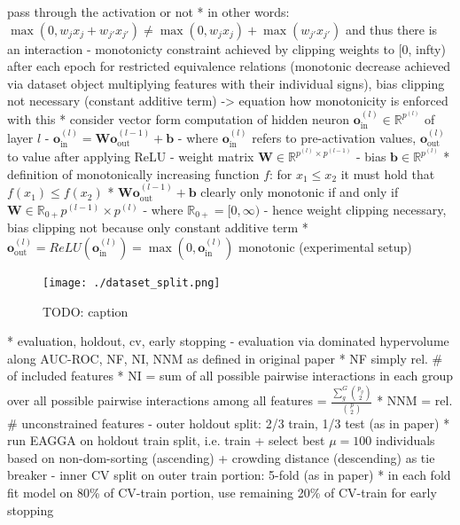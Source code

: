 \documentclass[twoside,11pt]{article}
\begin{document}
        pass through the activation or not
      * in other words: $\max(0,w_j x_j + w_{j'} x_{j'})\neq\max(0,w_j x_j)+\max(w_{j'} x_{j'})$ and thus there is an interaction
    - monotonicty constraint achieved by clipping weights to [0, infty) after each epoch for restricted equivalence relations (monotonic decrease achieved
      via dataset object multiplying features with their individual signs), bias clipping not necessary (constant additive term)
      -> equation how monotonicity is enforced with this
      * consider vector form computation of hidden neuron $\boldsymbol{o}_{\text{in}}^{(l)}\in\mathbb{R}^{p^{(l)}}$ of layer $l$
        - $\boldsymbol{o}_{\text{in}}^{(l)}=\boldsymbol{W} \boldsymbol{o}_{\text{out}}^{(l-1)} + \boldsymbol{b}$
        - where $\boldsymbol{o}_{\text{in}}^{(l)}$ refers to pre-activation values, $\boldsymbol{o}_{\text{out}}^{(l)}$ to value after applying ReLU
        - weight matrix $\boldsymbol{W}\in\mathbb{R}^{p^{(l)} \times p^{(l-1)}}$
        - bias $\boldsymbol{b}\in\mathbb{R}^{p^{(l)}}$
      * definition of monotonically increasing function $f$: for $x_1\le x_2$ it must hold that $f(x_1)\le f(x_2)$
      * $\boldsymbol{W} \boldsymbol{o}_{\text{out}}^{(l-1)} + \boldsymbol{b}$ clearly only monotonic if and only if $\boldsymbol{W}\in\mathbb{R}_{0+}{p^{(l-1)}\times p^{(l)}}$
        - where $\mathbb{R}_{0+}=[0,\infty)$
        - hence weight clipping necessary, bias clipping not because only constant additive term
      * $\boldsymbol{o}_{\text{out}}^{(l)}=ReLU(\boldsymbol{o}_{\text{in}}^{(l)})=\max(0,\boldsymbol{o}_{\text{in}}^{(l)})$ monotonic
  (experimental setup)
\begin{figure}
  \centering
  \texttt{[image: ./dataset\_split.png]}
  \caption{TODO: caption}
  \label{fig-dataset-split}
\end{figure}
  * evaluation, holdout, cv, early stopping
    - evaluation via dominated hypervolume along AUC-ROC, NF, NI, NNM as defined in original paper
      * NF simply rel. \# of included features
      * NI = sum of all possible pairwise interactions in each group over all possible pairwise interactions among all features = $\frac{\sum_g^G {p_g \choose 2}}{{p \choose 2}}$
      * NNM = rel. \# unconstrained features
    - outer holdout split: 2/3 train, 1/3 test (as in paper)
      * run EAGGA on holdout train split, i.e. train + select best $\mu=100$ individuals based on non-dom-sorting (ascending) + crowding distance (descending) as tie breaker
    - inner CV split on outer train portion: 5-fold (as in paper)
      * in each fold fit model on 80\% of CV-train portion, use remaining 20\% of CV-train for early stopping
\end{document}
